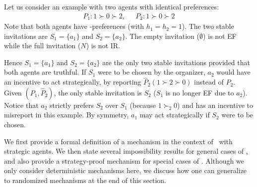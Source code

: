 \begin{example} \label{GT:eg:strategicAgents}
	
	Let us consider an example with two agents with identical preferences:
	\begin{equation*}
		\begin{aligned}
				P_1: 1 \succ 0 \succ 2,~~~& P_2: 1 \succ 0 \succ 2
		\end{aligned}
	\end{equation*}
	Note that both agents have \DEC-preferences (with $h_1 = h_2 = 1$).
	The two stable invitations are $S_1 = \{a_1\}$ and $S_2 = \{a_2\}$. 
	The empty invitation ($\emptyset$) is not EF while the full invitation ($N$) is not IR. 

	Hence $S_1 = \{a_1\}$ and $S_2 =\{a_2\}$ are the only two stable invitations provided that both agents are truthful. 
	If $S_1$ were to be chosen by the organizer, $a_2$ would have an incentive to act strategically, by reporting $\hat{P}_2 (1 \succ 2 \succ 0)$ instead of $P_2$. 
	Given $(P_1, \hat{P}_2)$, the only stable invitation is $S_2$ ($S_1$ is no longer EF due to $a_2$).
	Notice that $a_2$ strictly prefers $S_2$ over $S_1$ (because $1 \succ_2 0$) and has an incentive to misreport in this example. By symmetry, $a_1$ may act strategically if $S_2$ were to be chosen. 
\end{example}

We first provide a formal definition of a mechanism in the context of \ASIP\ with strategic agents. 
We then state several impossibility results for general cases of \ASIP, and also provide a strategy-proof mechanism for special cases of \ASIP.  Although we only consider deterministic mechanisms here, we discuss how one can generalize to randomized mechanisms at the end of this section.

